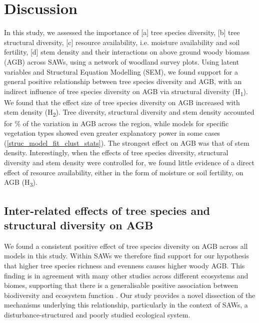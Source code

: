 \documentclass[11pt,a4paper]{article}
\begin{document}
\section{Discussion}


In this study, we assessed the importance of [a] tree species diversity, [b] tree structural diversity, [c] resource availability, i.e. moisture availability and soil fertility, [d] stem density and their interactions on above ground woody biomass (AGB) across SAWs, using a network of \nplots{} woodland survey plots. Using latent variables and Structural Equation Modelling (SEM), we found support for a general positive relationship between tree species diversity and AGB, with an indirect influence of tree species diversity on AGB via structural diversity (H\textsubscript{1}). We found that the effect size of tree species diversity on AGB increased with stem density (H\textsubscript{2}).  Tree diversity, structural diversity and stem density accounted for \srsq{}\% of the variation in AGB across the region, while models for specific vegetation types showed even greater explanatory power in some cases (\autoref{struc_model_fit_clust_stats}). The strongest effect on AGB was that of stem density. Interestingly, when the effects of tree species diversity, structural diversity and stem density were controlled for, we found little evidence of a direct effect of resource availability, either in the form of moisture or soil fertility, on AGB (H\textsubscript{3}). 

\subsection{Inter-related effects of tree species and structural diversity on AGB}

We found a consistent positive effect of tree species diversity on AGB across all models in this study. Within SAWs we therefore find support for our hypothesis that higher tree species richness and evenness causes higher woody AGB. This finding is in agreement with many other studies across different ecosystems and biomes, supporting  that there is a generalisable positive association between biodiversity and ecosystem function \citep{Liang2016, Cardinale2009}. Our study provides a novel dissection of the mechanisms underlying this relationship, particularly in the context of SAWs, a disturbance-structured and poorly studied ecological system.
\end{document}
